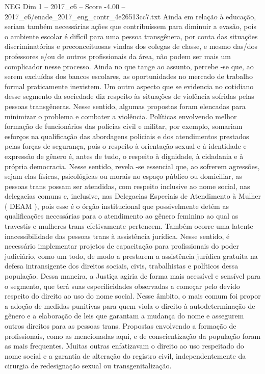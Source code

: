 \begin{textsample}{NEG Dim 1 – 2017\_c6 – Score -4.00 – 2017\_c6/enade\_2017\_eng\_contr\_4e26513cc7.txt}
Ainda em relação à educação, seriam também necessárias ações que contribuíssem para diminuir a evasão, pois o ambiente escolar é difícil para uma pessoa transgênera, por conta das situações discriminatórias e preconceituosas vindas dos colegas de classe, e mesmo das/dos professores e/ou de outros profissionais da área, não podem ser mais um complicador nesse processo.
Ainda no que tange ao assunto, percebe -se que, ao serem excluídas dos bancos escolares, as oportunidades no mercado de trabalho formal praticamente inexistem.
Um outro aspecto que se evidencia no cotidiano desse segmento da sociedade diz respeito às situações de violência sofridas pelas pessoas transgêneras.
Nesse sentido, algumas propostas foram elencadas para minimizar o problema e combater a violência.
Políticas envolvendo melhor formação de funcionários das polícias civil e militar, por exemplo, somariam esforços na qualificação das abordagens policiais e dos atendimentos prestados pelas forças de segurança, pois o respeito à orientação sexual e à identidade e expressão de gênero é, antes de tudo, o respeito à dignidade, à cidadania e à própria democracia.
Nesse sentido, revela -se essencial que, ao sofrerem agressões, sejam elas físicas, psicológicas ou morais no espaço público ou domiciliar, as pessoas trans possam ser atendidas, com respeito inclusive ao nome social, nas delegacias comuns e, inclusive, nas Delegacias Especiais de Atendimento à Mulher ( DEAM ), pois esse é o órgão institucional que possivelmente detém as qualificações necessárias para o atendimento ao gênero feminino ao qual as travestis e mulheres trans efetivamente pertencem.
Também ocorre uma latente inacessibilidade das pessoas trans à assistência jurídica.
Nesse sentido, é necessário implementar projetos de capacitação para profissionais do poder judiciário, como um todo, de modo a prestarem a assistência jurídica gratuita na defesa intransigente dos direitos sociais, civis, trabalhistas e políticos dessa população.
Dessa maneira, a Justiça agiria de forma mais acessível e sensível para o segmento, que terá suas especificidades observadas a começar pelo devido respeito do direito ao uso do nome social.
Nesse âmbito, o mais comum foi propor a adoção de medidas punitivas para quem viola o direito à autodeterminação de gênero e a elaboração de leis que garantam a mudança do nome e assegurem outros direitos para as pessoas trans.
Propostas envolvendo a formação de profissionais, como as mencionadas aqui, e de conscientização da população foram as mais frequentes.
Muitas outras enfatizavam o direito ao uso respeitado do nome social e a garantia de alteração do registro civil, independentemente da cirurgia de redesignação sexual ou transgenitalização.

\end{textsample}
